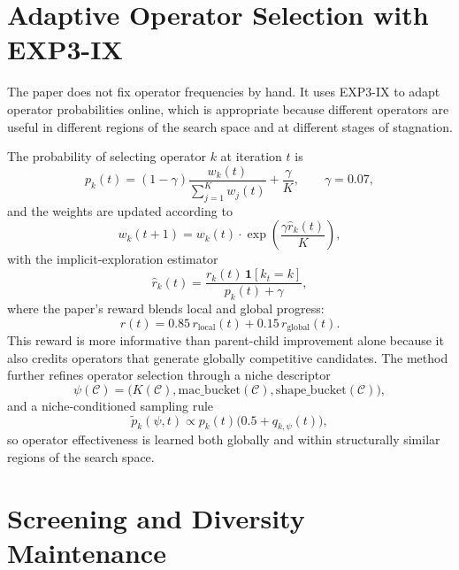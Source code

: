 \section{Adaptive Operator Selection with EXP3-IX}
\label{subsec:exp3}

The paper does not fix operator frequencies by hand. It uses EXP3-IX to adapt operator probabilities online, which is appropriate because different operators are useful in different regions of the search space and at different stages of stagnation.

The probability of selecting operator $k$ at iteration $t$ is
\begin{equation}
  p_k(t) = (1-\gamma)\frac{w_k(t)}{\sum_{j=1}^K w_j(t)} + \frac{\gamma}{K},
  \qquad \gamma = 0.07,
  \label{eq:exp3_prob}
\end{equation}
and the weights are updated according to
\begin{equation}
  w_k(t+1) = w_k(t) \cdot \exp\!\left(\frac{\gamma \hat{r}_k(t)}{K}\right),
  \label{eq:exp3_update}
\end{equation}
with the implicit-exploration estimator
\begin{equation}
  \hat{r}_k(t) = \frac{r_k(t)\,\mathbf{1}[k_t = k]}{p_k(t) + \gamma},
  \label{eq:exp3_reward}
\end{equation}
where the paper's reward blends local and global progress:
\begin{equation}
  r(t)=0.85\,r_{\mathrm{local}}(t)+0.15\,r_{\mathrm{global}}(t).
  \label{eq:design_reward_blend}
\end{equation}
This reward is more informative than parent-child improvement alone because it also credits operators that generate globally competitive candidates. The method further refines operator selection through a niche descriptor
\begin{equation}
  \psi(\mathcal{C})
  =
  \bigl(K(\mathcal{C}),\mathrm{mac\_bucket}(\mathcal{C}),\mathrm{shape\_bucket}(\mathcal{C})\bigr),
  \label{eq:design_niche_descriptor}
\end{equation}
and a niche-conditioned sampling rule
\begin{equation}
  \tilde p_k(\psi,t)\propto p_k(t)\bigl(0.5+q_{k,\psi}(t)\bigr),
  \label{eq:design_niche_sampling}
\end{equation}
so operator effectiveness is learned both globally and within structurally similar regions of the search space.

\section{Screening and Diversity Maintenance}
\label{subsec:diversity}

